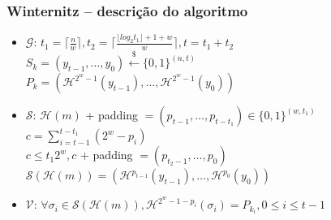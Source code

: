 \documentclass{beamer}
\begin{document}
\begin{frame}
  \frametitle{Winternitz -- descrição do algoritmo}
  \begin{itemize}
    \item $\mathcal{G}$:
      $t_1 = \lceil \frac{n}{w} \rceil,
       t_2 = \lceil \frac{\lfloor log_2 t_1 \rfloor + 1 + w}{w} \rceil,
         t = t_1 + t_2$ \\

      \hspace{1.3em}
      $S_k = (y_{t - 1}, \dots, y_{0})
        \stackrel{\$}{\longleftarrow} \{0,1\}^{(n, t)}$ \\

      \hspace{1.3em}
      $P_k = (\mathcal{H}^{2^w - 1}(y_{t - 1}), \dots,
        \mathcal{H}^{2^w - 1}(y_0))$

    \item $\mathcal{S}$:
      $\mathcal{H}(m)$ + padding
        $= (p_{t - 1}, \dots, p_{t - t_1}) \in \{0, 1\}^{(w, t_1)}$ \\

      \hspace{1.3em}
      $c = \sum_{i = t - 1}^{t - t_1} (2^w - p_i)$ \\

      \hspace{1.3em}
      $c \leq t_1 2^w, c$ + padding $= (p_{t_2 - 1}, \dots, p_{0})$ \\

      \hspace{1.3em}
      $\mathcal{S}(\mathcal{H}(m)) = (\mathcal{H}^{p_{t - 1}}(y_{t - 1}),
        \dots, \mathcal{H}^{p_0}(y_0))$

    \item $\mathcal{V}$:
      $\forall \sigma_i \in \mathcal{S}(\mathcal{H}(m)),
        \mathcal{H}^{2^w - 1 - p_{i}}(\sigma_i)
        = P_{k_i}, 0 \leq i \leq t - 1$
  \end{itemize}
\end{frame}
\end{document}
